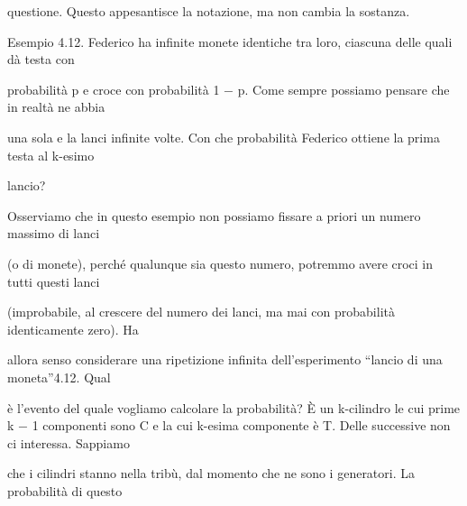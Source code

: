 \documentclass[a4paper,portrait,12pt]{article}
\begin{document}
\begin{flushleft}
questione. Questo appesantisce la notazione, ma non cambia la sostanza.
\end{flushleft}


\begin{flushleft}
Esempio 4.12. Federico ha infinite monete identiche tra loro, ciascuna delle quali d\`{a} testa con
\end{flushleft}


\begin{flushleft}
probabilit\`{a} p e croce con probabilit\`{a} 1 $-$ p. Come sempre possiamo pensare che in realt\`{a} ne abbia
\end{flushleft}


\begin{flushleft}
una sola e la lanci infinite volte. Con che probabilit\`{a} Federico ottiene la prima testa al k-esimo
\end{flushleft}


\begin{flushleft}
lancio?
\end{flushleft}


\begin{flushleft}
Osserviamo che in questo esempio non possiamo fissare a priori un numero massimo di lanci
\end{flushleft}


\begin{flushleft}
(o di monete), perch\'{e} qualunque sia questo numero, potremmo avere croci in tutti questi lanci
\end{flushleft}


\begin{flushleft}
(improbabile, al crescere del numero dei lanci, ma mai con probabilit\`{a} identicamente zero). Ha
\end{flushleft}


\begin{flushleft}
allora senso considerare una ripetizione infinita dell'esperimento ``lancio di una moneta''4.12. Qual
\end{flushleft}


\begin{flushleft}
\`{e} l'evento del quale vogliamo calcolare la probabilit\`{a}? \`{E} un k-cilindro le cui prime k $-$ 1 componenti sono C e la cui k-esima componente \`{e} T. Delle successive non ci interessa. Sappiamo
\end{flushleft}


\begin{flushleft}
che i cilindri stanno nella tribù, dal momento che ne sono i generatori. La probabilit\`{a} di questo
\end{flushleft}
\end{document}
